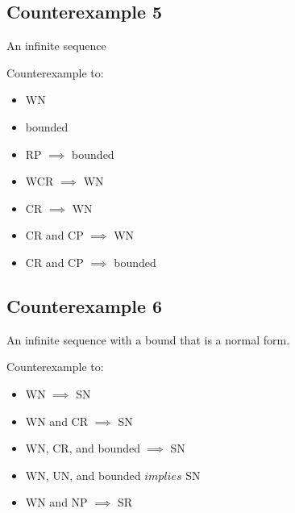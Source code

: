 \documentclass{scrartcl}
\begin{document}
\subsection*{Counterexample 5}
An infinite sequence
  \begin{center}
    \end{center}
Counterexample to:
\begin{itemize}
  \item WN
  \item bounded
  \item RP $\implies$ bounded
  \item WCR $\implies$ WN
  \item CR $\implies$ WN
  \item CR and CP $\implies$ WN
  \item CR and CP $\implies$ bounded
\end{itemize}

\subsection*{Counterexample 6}
An infinite sequence with a bound that is a normal form.
\begin{center}



    \end{center}
Counterexample to:
\begin{itemize}
  \item WN $\implies$ SN
  \item WN and CR $\implies$ SN
  \item WN, CR, and bounded $\implies$ SN
  \item WN, UN, and bounded $implies$ SN
  \item WN and NP $\implies$ SR
\end{itemize}
\end{document}
